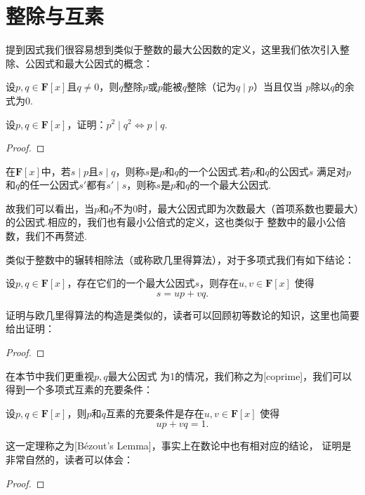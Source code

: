 \section{整除与互素}
提到因式我们很容易想到类似于整数的最大公因数的定义，这里我们依次引入整除、公因式和最大公因式的概念：
\begin{definition}
    设$p,q\in\mathbf{F}[x]$且$q\neq 0$，则$q$整除$p$或$p$能被$q$整除（记为$q \mid p$）当且仅当
    $p$除以$q$的余式为0.
\end{definition}
\begin{example}
    设$p,q\in\mathbf{F}[x]$，证明：$p^2 \mid q^2\iff p \mid q$.
\end{example}
\begin{proof}
    
\end{proof}

\begin{definition}
    在$\mathbf{F}[x]$中，若$s \mid p$且$s \mid q$，则称$s$是$p$和$q$的一个公因式.若$p$和$q$的公因式$s$
    满足对$p$和$q$的任一公因式$s'$都有$s' \mid s$，则称$s$是$p$和$q$的一个最大公因式.
\end{definition}
故我们可以看出，当$p$和$q$不为0时，最大公因式即为次数最大（首项系数也要最大）的公因式.相应的，我们也有最小公倍式的定义，这也类似于
整数中的最小公倍数，我们不再赘述.

类似于整数中的辗转相除法（或称欧几里得算法），对于多项式我们有如下结论：
\begin{theorem}\label{thm:14:欧几里得算法}
    设$p,q\in\mathbf{F}[x]$，存在它们的一个最大公因式$s$，则存在$u,v\in\mathbf{F}[x]$
    使得\[s=up+vq.\]
\end{theorem}
证明与欧几里得算法的构造是类似的，读者可以回顾初等数论的知识，这里也简要给出证明：

\begin{proof}
    
\end{proof}

在本节中我们更重视$p,q$最大公因式
为1的情况，我们称之为[coprime]，我们可以得到一个多项式互素的充要条件：
\begin{theorem}\label{thm:14:裴蜀定理}
    设$p,q\in\mathbf{F}[x]$，则$p$和$q$互素的充要条件是存在$u,v\in\mathbf{F}[x]$
    使得\[up+vq=1.\]
\end{theorem}
这一定理称之为[B\'ezout's Lemma]，事实上在数论中也有相对应的结论，
证明是非常自然的，读者可以体会：

\begin{proof}
    
\end{proof}

